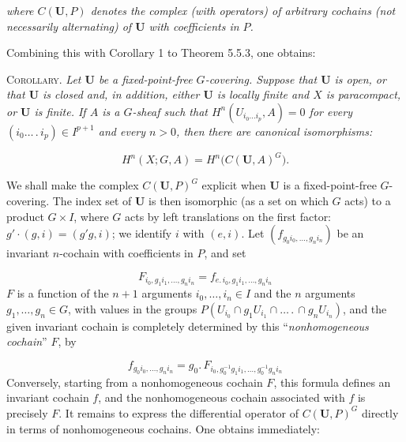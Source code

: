 \clearpage
{}

\noindent\textit{where $C({\mathbf U},P)$ denotes the complex (with operators)
of arbitrary cochains (not necessarily alternating) of ${\mathbf U}$ with
coefficients in $P$.}

Combining this with Corollary 1 to Theorem 5.5.3, one obtains:

\textsc{Corollary.} \textit{Let ${\mathbf U}$ be a fixed-point-free
$G$-covering. Suppose that ${\mathbf U}$ is open, or that ${\mathbf U}$ is closed
and, in addition, either ${\mathbf U}$ is locally finite and $X$ is paracompact,
or ${\mathbf U}$ is finite. If $A$ is a
$G$-sheaf such that $H^n(U_{i_0\ldots i_p},A)=0$ for every
$(i_0\ldots\,.\,i_p)\in I^{p+1}$ and every $n>0$, then there are canonical
isomorphisms:}

\[
H^n(X;G,A)=H^n\bigl(C({\mathbf U},A)^G\bigr).
\]

We shall make the complex $C({\mathbf U},P)^G$ explicit when ${\mathbf U}$ is a
fixed-point-free $G$-covering. The index set of ${\mathbf U}$ is then
isomorphic (as a set on which $G$ acts) to a product $G\times I$, where $G$
acts by left translations on the first factor:
$g'\cdot(g,i)=(g'g,i)$; we identify $i$ with $(e,i)$. Let
$(f_{g_0i_0,\ldots,g_ni_n})$ be an invariant $n$-cochain with coefficients in
$P$, and set

\[
\tag{5.5.9}
F_{i_0,g_1i_1,\ldots,g_ni_n}
=f_{e.\,i_0,g_1i_1,\ldots,g_ni_n}
\]
$F$ is a function of the $n+1$ arguments $i_0,\ldots,i_n\in I$ and the $n$
arguments $g_1,\ldots,g_n\in G$, with values in the groups
$P(U_{i_0}\cap g_1U_{i_1}\cap\ldots\,.\,\cap g_nU_{i_n})$, and the given invariant
cochain is completely determined by this ``\emph{nonhomogeneous cochain}'' $F$, by

\[
\tag{5.5.10}
f_{g_0i_0,\ldots,g_ni_n}
=g_0.\,F_{i_0,g_0^{-1}g_1i_1,\ldots,g_0^{-1}g_ni_n}
\]
Conversely, starting from a nonhomogeneous cochain $F$, this formula defines
an invariant cochain $f$, and the nonhomogeneous cochain associated with $f$
is precisely $F$. It remains to express the differential operator of
$C({\mathbf U},P)^G$ directly in terms of nonhomogeneous cochains. One obtains
immediately:

